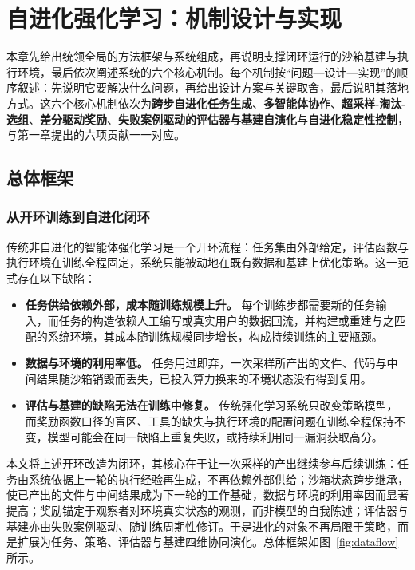 \chapter{自进化强化学习：机制设计与实现}

本章先给出统领全局的方法框架与系统组成，再说明支撑闭环运行的沙箱基建与执行环境，最后依次阐述系统的六个核心机制。每个机制按“问题—设计—实现”的顺序叙述：先说明它要解决什么问题，再给出设计方案与关键取舍，最后说明其落地方式。这六个核心机制依次为\textbf{跨步自进化任务生成}、\textbf{多智能体协作}、\textbf{超采样-淘汰-选组}、\textbf{差分驱动奖励}、\textbf{失败案例驱动的评估器与基建自演化}与\textbf{自进化稳定性控制}，与第一章提出的六项贡献一一对应。

\section{总体框架}

\subsection{从开环训练到自进化闭环}

传统非自进化的智能体强化学习是一个开环流程：任务集由外部给定，评估函数与执行环境在训练全程固定，系统只能被动地在既有数据和基建上优化策略。这一范式存在以下缺陷：

\begin{itemize}
    \item \textbf{任务供给依赖外部，成本随训练规模上升。} 每个训练步都需要新的任务输入，而任务的构造依赖人工编写或真实用户的数据回流，并构建或重建与之匹配的系统环境，其成本随训练规模同步增长，构成持续训练的主要瓶颈。
    \item \textbf{数据与环境的利用率低。} 任务用过即弃，一次采样所产出的文件、代码与中间结果随沙箱销毁而丢失，已投入算力换来的环境状态没有得到复用。
    \item \textbf{评估与基建的缺陷无法在训练中修复。} 传统强化学习系统只改变策略模型，而奖励函数口径的盲区、工具的缺失与执行环境的配置问题在训练全程保持不变，模型可能会在同一缺陷上重复失败，或持续利用同一漏洞获取高分。
\end{itemize}

本文将上述开环改造为闭环，其核心在于让一次采样的产出继续参与后续训练：任务由系统依据上一轮的执行经验再生成，不再依赖外部供给；沙箱状态跨步继承，使已产出的文件与中间结果成为下一轮的工作基础，数据与环境的利用率因而显著提高；奖励锚定于观察者对环境真实状态的观测，而非模型的自我陈述；评估器与基建亦由失败案例驱动、随训练周期性修订。于是进化的对象不再局限于策略，而是扩展为任务、策略、评估器与基建四维协同演化。总体框架如图~\ref{fig:dataflow} 所示。

